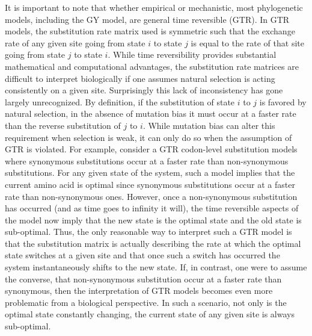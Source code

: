 \documentclass[13pt]{article}
\begin{document}
It is important to note that whether empirical or mechanistic, most phylogenetic models, including the GY model, are general time reversible (GTR).
In GTR models, the substitution rate matrix used is symmetric such that the exchange rate of any given site going from state $i$ to state $j$ is equal to the rate of that site going from state $j$ to state $i$.
While time reversibility provides substantial mathematical and computational advantages, the substitution rate matrices are difficult to interpret biologically if one assumes natural selection is acting consistently on a given site.
Surprisingly this lack of inconsistency has gone largely unrecognized.
By definition, if the substitution of state $i$ to $j$ is favored by natural selection, in the absence of mutation bias it must occur at a faster rate than the reverse substitution of $j$ to $i$.
While mutation bias can alter this requirement when selection is weak, it can only do so when the assumption of GTR is violated.
For example, consider a GTR codon-level substitution models where synonymous substitutions occur at a faster rate than non-synonymous substitutions.
For any given state of the system, such a model implies that the current amino acid is optimal since synonymous substitutions occur at a faster rate than non-synonymous ones.
However, once a non-synonymous substitution has occurred (and as time goes to infinity it will),  the time reversible aspects of the model now imply that the new state is the optimal state and the old state is sub-optimal.
Thus, the only reasonable way to interpret such a GTR model is that the substitution matrix is actually describing the rate at which the optimal state switches at a given site and that once such a switch has occurred the system instantaneously shifts to the new state.
If, in contrast, one were to assume the converse, that non-synonymous substitution occur at a faster rate than synonymous, then the interpretation of GTR models becomes even more problematic from a biological perspective.
In such a scenario, not only is the optimal state constantly changing, the current state of any given site is always sub-optimal.
\end{document}
